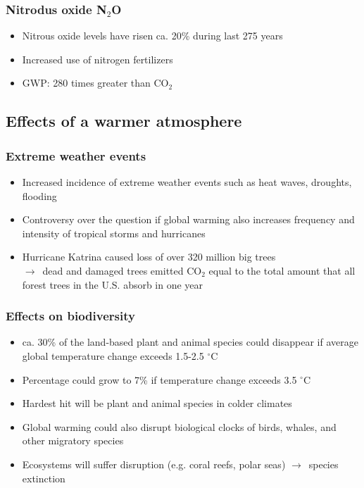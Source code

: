 \documentclass{article}
\begin{document}
\subsubsection{Nitrodus oxide N$_2$O}
\begin{itemize}
    \item Nitrous oxide levels have risen ca. 20\% during last 275 years
    \item Increased use of nitrogen fertilizers
    \item GWP: 280 times greater than CO$_2$
\end{itemize}

\subsection{Effects of a warmer atmosphere}
\subsubsection{Extreme weather events}
\begin{itemize}
    \item Increased incidence of extreme weather events such as heat waves, droughts, flooding
    \item Controversy over the question if global warming also increases frequency and intensity of tropical storms and hurricanes
    \item Hurricane Katrina caused loss of over 320 million big trees\\
    $\to$\ dead and damaged trees emitted CO$_2$ equal to the total amount that all forest trees in the U.S. absorb in one year
\end{itemize}

\subsubsection{Effects on biodiversity}
\begin{itemize}
    \item ca. 30\% of the land-based plant and animal species could disappear if average global temperature change exceeds 1.5-2.5 $^\circ$C
    \item Percentage could grow to 7\% if temperature change exceeds 3.5 $^\circ$C
    \item Hardest hit will be plant and animal species in colder climates
    \item Global warming could also disrupt biological clocks of birds, whales, and other migratory species
    \item Ecosystems will suffer disruption (e.g. coral reefs, polar seas) $\to$\ species extinction
\end{itemize}
\end{document}
